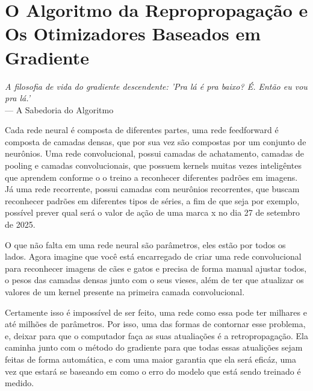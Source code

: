 
\chapter{O Algoritmo da Repropropagação e Os Otimizadores Baseados em Gradiente}
\label{cap:retropropagacao-gradiente}

\begin{flushright}
\textit{A filosofia de vida do gradiente descendente: 'Pra lá é pra baixo? É. Então eu vou pra lá.'} \\
--- A Sabedoria do Algoritmo
\end{flushright}


Cada rede neural é composta de diferentes partes, uma rede feedforward é composta de camadas densas, que por sua vez são compostas por um conjunto de neurônios. Uma rede convolucional, possui camadas de achatamento, camadas de pooling e camadas convolucionais, que possuem kernels muitas vezes inteligêntes que aprendem conforme o o treino a reconhecer diferentes padrões em imagens. Já uma rede recorrente, possui camadas com neurônios recorrentes, que buscam reconhecer padrões em diferentes tipos de séries, a fim de que seja por exemplo, possível prever qual será o valor de ação de uma marca x no dia 27 de setembro de 2025.

O que não falta em uma rede neural são parâmetros, eles estão por todos os lados. Agora imagine que você está encarregado de criar uma rede convolucional para reconhecer imagens de cães e gatos e precisa de forma manual ajustar todos, o pesos das camadas densas junto com o seus vieses, além de ter que atualizar os valores de um kernel presente na primeira camada convolucional.

Certamente isso é impossível de ser feito, uma rede como essa pode ter milhares e até milhões de parâmetros. Por isso, uma das formas de contornar esse problema, e, deixar para que o computador faça as suas atualiações é a retropropagação. Ela caminha junto com o método do gradiente para que todas essas atualições sejam feitas de forma automática, e com uma maior garantia que ela será eficáz, uma vez que estará se baseando em como o erro do modelo que está sendo treinado é medido.

